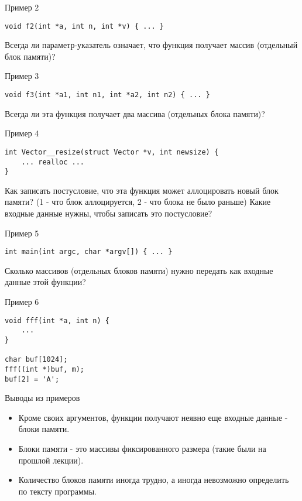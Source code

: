 \documentclass[hyperref={unicode=true}]{beamer}
\begin{document}
    \begin{frame}[fragile]{Пример 2}
    \begin{lstlisting}
void f2(int *a, int n, int *v) { ... }
    \end{lstlisting}
    Всегда ли параметр-указатель означает, что функция
    получает массив (отдельный блок памяти)?
    \end{frame}

    \begin{frame}[fragile]{Пример 3}
    \begin{lstlisting}
void f3(int *a1, int n1, int *a2, int n2) { ... }
    \end{lstlisting}
    Всегда ли эта функция получает два массива
    (отдельных блока памяти)?
    \end{frame}

    \begin{frame}[fragile]{Пример 4}
    \begin{lstlisting}
int Vector__resize(struct Vector *v, int newsize) {
    ... realloc ...
}
    \end{lstlisting}
    Как записать постусловие, что эта функция может
    аллоцировать новый блок памяти? (1 - что блок
    аллоцируется, 2 - что блока не было раньше)
    Какие входные данные нужны, чтобы записать это
    постусловие?
    \end{frame}

    \begin{frame}[fragile]{Пример 5}
    \begin{lstlisting}
int main(int argc, char *argv[]) { ... }
    \end{lstlisting}
    Сколько массивов (отдельных блоков памяти) нужно
    передать как входные данные этой функции?
    \end{frame}

    \begin{frame}[fragile]{Пример 6}
    \begin{lstlisting}
void fff(int *a, int n) {
    ...
}

char buf[1024];
fff((int *)buf, m);
buf[2] = 'A';
    \end{lstlisting}
    \end{frame}

    \begin{frame}{Выводы из примеров}
    \begin{itemize}
    \item
    Кроме своих аргументов, функции получают неявно
    еще входные данные - блоки памяти.
    \item
    Блоки памяти - это массивы фиксированного размера
    (такие были на прошлой лекции).
    \item
    Количество блоков памяти иногда трудно, а иногда
    невозможно определить по тексту программы.
    \end{itemize}
    \end{frame}
\end{document}

